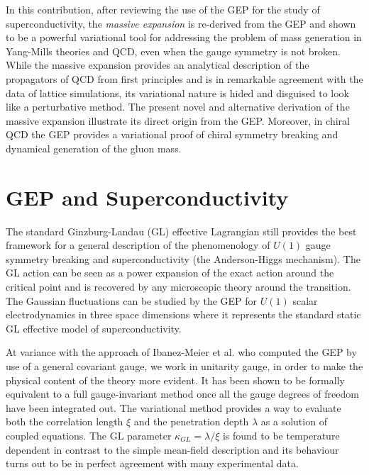 \documentclass[aps,preprint]{revtex4}
\begin{document}
In this contribution, after reviewing the use of the GEP for the study of superconductivity\cite{gaussian,interpolation},  
the {\it massive expansion}\cite{ptqcd,ptqcd2,analyt} is re-derived from the GEP and shown to
be a powerful variational tool for addressing the problem of mass generation in Yang-Mills theories and
QCD, even when the gauge symmetry is not broken. While the massive expansion provides an analytical description of
the propagators of QCD from first principles\cite{ptqcd,ptqcd2} 
and is in remarkable agreement with the data of lattice simulations\cite{analyt,scaling}, its 
variational nature is hided and disguised to look like a perturbative method. The present novel and alternative
derivation of the massive expansion illustrate its direct origin from the GEP. Moreover, in chiral QCD the GEP 
provides a variational proof of chiral symmetry breaking and dynamical generation of the gluon mass.


\section{GEP and Superconductivity}
\label{sec2} 

The standard 
Ginzburg-Landau (GL) effective Lagrangian still provides the best 
framework for a general description of the phenomenology of $U(1)$
gauge symmetry breaking and superconductivity (the Anderson-Higgs mechanism).
The GL action can be seen as a power expansion of
the exact action around the critical point and is
recovered by any microscopic theory around the transition.
The Gaussian fluctuations can be studied by the GEP for $U(1)$ scalar electrodynamics
in three space dimensions\cite{gaussian,interpolation} where it represents the standard static
GL effective model of superconductivity. 
 
At variance with the approach of 
Ibanez-Meier et al.\cite{ibanez} who computed the GEP by use of a general
covariant gauge, we work in unitarity gauge, in order to make the physical content of the theory
more evident.
It has been shown to be formally equivalent to a full
gauge-invariant method once all the gauge degrees of freedom have
been integrated out\cite{mansfield}. The variational method
provides a way to evaluate both the correlation length $\xi$ and the
penetration depth $\lambda$ as a solution of coupled equations.
The GL parameter $\kappa_{GL}=\lambda/\xi$ is found to be temperature
dependent in contrast to the simple mean-field description and its
behaviour turns out to be in perfect agreement with many
experimental data\cite{gaussian,interpolation}.
\end{document}
